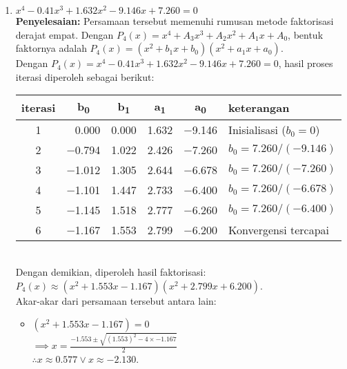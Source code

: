 \documentclass{article}
\newcommand{\penyelesaian}{\textbf{Penyelesaian: }}
\begin{document}
\begin{enumerate}
\begin{enumerate}
        \item $x^4 - \num{0,41}x^3 + \num{1,632}x^2 - \num{9,146}x + \num{7,260} = 0$ \\
        \penyelesaian Persamaan tersebut memenuhi rumusan metode faktorisasi derajat empat.
        Dengan $P_4(x) = x^4 + A_3x^3 + A_2x^2 + A_1x + A_0$, bentuk faktornya adalah $P_4(x) = (x^2 + b_1x + b_0)(x^2 + a_1x + a_0)$. \\
        
        Dengan $P_4(x) = x^4 - \num{0,41}x^3 + \num{1,632}x^2 - \num{9,146}x + \num{7,260} = 0$, hasil proses iterasi diperoleh sebagai berikut: \\
        \begin{tabular}{|c|r|r|r|r|l|}
            \hline
            \textbf{iterasi} & \multicolumn{1}{c|}{\textbf{b\textsubscript{0}}} & \multicolumn{1}{c|}{\textbf{b\textsubscript{1}}} & \multicolumn{1}{c|}{\textbf{a\textsubscript{1}}} & \multicolumn{1}{c|}{\textbf{a\textsubscript{0}}} & \textbf{keterangan} \\ \hline
            1 & \num{0,000} & \num{0,000} & \num{1,632} & \num{-9,146} & Inisialisasi ($b_0 = 0$) \\ \hline
            2 & \num{-0,794} & \num{1,022} & \num{2,426} & \num{-7,260} & $b_0 = \num{7,260}/(\num{-9,146})$ \\ \hline
            3 & \num{-1,012} & \num{1,305} & \num{2,644} & \num{-6,678} & $b_0 = \num{7,260}/(\num{-7,260})$ \\ \hline
            4 & \num{-1,101} & \num{1,447} & \num{2,733} & \num{-6,400} & $b_0 = \num{7,260}/(\num{-6,678})$ \\ \hline
            5 & \num{-1,145} & \num{1,518} & \num{2,777} & \num{-6,260} & $b_0 = \num{7,260}/(\num{-6,400})$ \\ \hline
            6 & \num{-1,167} & \num{1,553} & \num{2,799} & \num{-6,200} & Konvergensi tercapai \\ \hline
        \end{tabular} \\
        Dengan demikian, diperoleh hasil faktorisasi:\\
        $P_4(x) \approx (x^2 + \num{1,553}x - \num{1,167})(x^2 + \num{2,799}x + \num{6,200})$. \\
        
        Akar-akar dari persamaan tersebut antara lain:
        \begin{itemize}
            \item $(x^2 + \num{1,553}x - \num{1,167}) = 0$ \\
            $ \implies x = \frac{-\num{1,553} \pm \sqrt{(\num{1,553})^2 - 4 \times \num{-1,167}}}{2}$ \\
            $ \therefore x \approx \num{0,577} \vee x \approx \num{-2,130}$.
        

\end{itemize}
\end{enumerate}
\end{enumerate}
\end{document}
